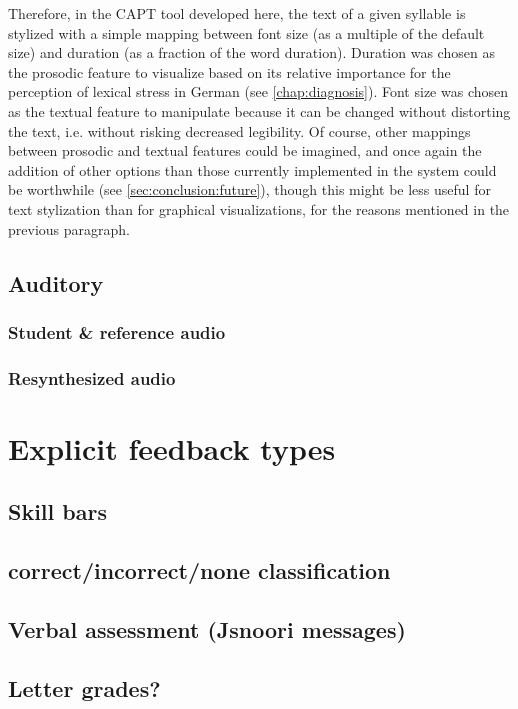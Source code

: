 		
		Therefore, in the CAPT tool developed here, the text of a given syllable is stylized with a simple mapping between font size (as a multiple of the default size) and duration (as a fraction of the word duration). Duration was chosen as the prosodic feature to visualize based on its relative importance for the perception of lexical stress in German (see \cref{chap:diagnosis}). Font size was chosen as the textual feature to manipulate because it can be changed without distorting the text, i.e. without risking decreased legibility. Of course, other mappings between prosodic and textual features could be imagined, and once again the addition of other options than those currently implemented in the system could be worthwhile (see \cref{sec:conclusion:future}), though this might be less useful for text stylization than for  graphical visualizations, for the reasons mentioned in the previous paragraph.
		
			
			
		\subsection{Auditory}
			\subsubsection{Student \& reference audio}
			\subsubsection{Resynthesized audio}
			
	\section{Explicit feedback types}
		\subsection{Skill bars}
		\subsection{correct/incorrect/none classification}
		\subsection{Verbal assessment (Jsnoori messages)}
		\subsection{Letter grades?}
		
